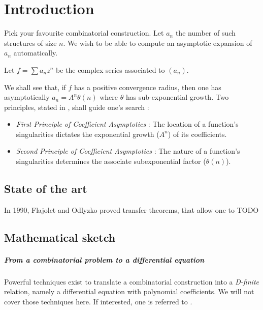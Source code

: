 \documentclass[../main.tex]{subfiles}
\begin{document}
\chapter{Introduction}


Pick your favourite combinatorial construction. Let $a_n$ the number of such structures of size $n$. We wish to be able to compute an asymptotic expansion of $a_n$ automatically.

Let $f = \sum a_n z^n$ be the complex series associated to $(a_n)$.

We shall see that, if $f$ has a positive convergence radius, then one has asymptotically $a_n = A^n \theta(n)$ where $\theta$ has sub-exponential growth.
Two principles, stated in \cite{Flajolet2009}, shall guide one's search :

\begin{itemize}
	\item	\emph{First Principle of Coefficient Asymptotics} : The location of a function’s
			singularities dictates the exponential growth ($A^n$) of its coefficients.
	
	\item	\emph{Second Principle of Coefficient Asymptotics} : The nature of a function’s
			singularities determines the associate subexponential factor ($\theta(n)$).
	
\end{itemize}

\section{State of the art}


In 1990, Flajolet and Odlyzko \cite{FlajoletOdlyzko1990} proved transfer theorems, that allow one to 
TODO %


\section{Mathematical sketch}

\paragraph{From a combinatorial problem to a differential equation}
Powerful techniques exist to translate a combinatorial construction into a \emph{D-finite} relation, namely a differential equation with polynomial coefficients.
We will not cover those techniques here. If interested, one is referred to \cite{Flajolet2009}.
\end{document}
